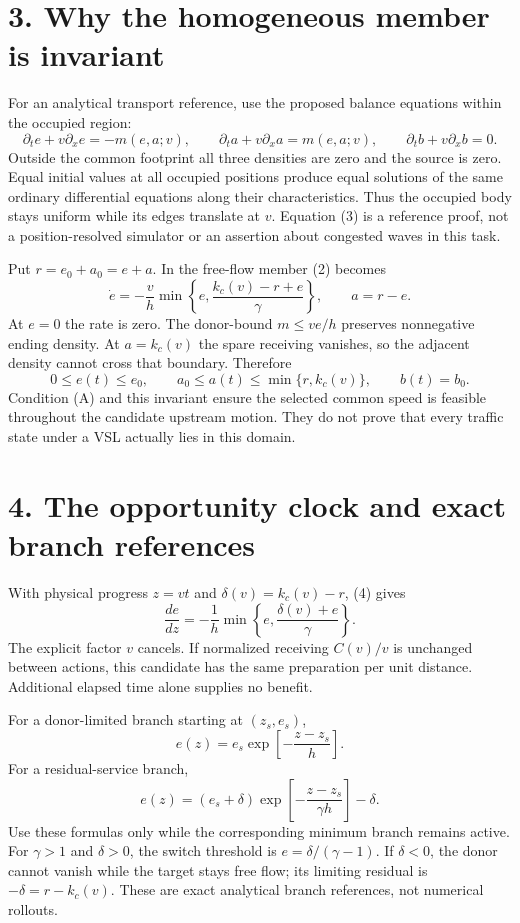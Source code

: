 \documentclass[11pt,a4paper]{article}
\begin{document}
\section*{3. Why the homogeneous member is invariant}
For an analytical transport reference, use the proposed balance equations
within the occupied region:
\[
 \partial_t e+v\partial_x e=-m(e,a;v),\qquad
 \partial_t a+v\partial_x a=m(e,a;v),\qquad
 \partial_t b+v\partial_x b=0.
 \tag{3}
\]
Outside the common footprint all three densities are zero and the source is
zero. Equal initial values at all occupied positions produce equal solutions
of the same ordinary differential equations along their characteristics.
Thus the occupied body stays uniform while its edges translate at $v$.
Equation (3) is a reference proof, not a position-resolved simulator or an
assertion about congested waves in this task.

Put $r=e_0+a_0=e+a$. In the free-flow member (2) becomes
\[
 \dot e=-\frac{v}{h}\min\left\{e,\frac{k_c(v)-r+e}{\gamma}\right\},
 \qquad a=r-e.
 \tag{4}
\]
At $e=0$ the rate is zero. The donor-bound $m\leq ve/h$ preserves
nonnegative ending density. At $a=k_c(v)$ the spare receiving vanishes, so
the adjacent density cannot cross that boundary. Therefore
\[
 0\leq e(t)\leq e_0,\qquad
 a_0\leq a(t)\leq\min\{r,k_c(v)\},\qquad b(t)=b_0.
 \tag{5}
\]
Condition (A) and this invariant ensure the selected common speed is feasible
throughout the candidate upstream motion. They do not prove that every
traffic state under a VSL actually lies in this domain.

\section*{4. The opportunity clock and exact branch references}
With physical progress $z=vt$ and $\delta(v)=k_c(v)-r$, (4) gives
\[
 \frac{de}{dz}=-\frac1h\min\left\{e,\frac{\delta(v)+e}{\gamma}\right\}.
 \tag{6}
\]
The explicit factor $v$ cancels. If normalized receiving $C(v)/v$ is
unchanged between actions, this candidate has the same preparation per unit
distance. Additional elapsed time alone supplies no benefit.

For a donor-limited branch starting at $(z_s,e_s)$,
\[
 e(z)=e_s\exp\left[-\frac{z-z_s}{h}\right].
 \tag{7}
\]
For a residual-service branch,
\[
 e(z)=(e_s+\delta)\exp\left[-\frac{z-z_s}{\gamma h}\right]-\delta.
 \tag{8}
\]
Use these formulas only while the corresponding minimum branch remains active.
For $\gamma>1$ and $\delta>0$, the switch threshold is
$e=\delta/(\gamma-1)$. If $\delta<0$, the donor cannot vanish while the
target stays free flow; its limiting residual is $-\delta=r-k_c(v)$.
These are exact analytical branch references, not numerical rollouts.
\end{document}
